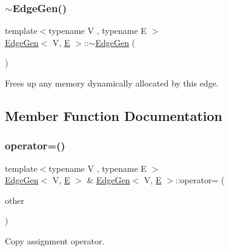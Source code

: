 \subsubsection{\texorpdfstring{$\sim$\+Edge\+Gen()}{~EdgeGen()}}
{\footnotesize\ttfamily template$<$typename V , typename E $>$ \\
\mbox{\hyperlink{classEdgeGen}{Edge\+Gen}}$<$ V, \mbox{\hyperlink{gmath_8h_ab587ba72a9c23f238cb4fd70e2fdb545}{E}} $>$\+::$\sim$\mbox{\hyperlink{classEdgeGen}{Edge\+Gen}} (\begin{DoxyParamCaption}{ }\end{DoxyParamCaption})}



Frees up any memory dynamically allocated by this edge. 



\subsection{Member Function Documentation}
\mbox{\label{classEdgeGen_adfd141be3aba2f0fec6a502db1476607}} 
\subsubsection{\texorpdfstring{operator=()}{operator=()}\hspace{0.1cm}{\footnotesize\ttfamily [1/2]}}
{\footnotesize\ttfamily template$<$typename V , typename E $>$ \\
\mbox{\hyperlink{classEdgeGen}{Edge\+Gen}}$<$ V, \mbox{\hyperlink{gmath_8h_ab587ba72a9c23f238cb4fd70e2fdb545}{E}} $>$ \& \mbox{\hyperlink{classEdgeGen}{Edge\+Gen}}$<$ V, \mbox{\hyperlink{gmath_8h_ab587ba72a9c23f238cb4fd70e2fdb545}{E}} $>$\+::operator= (\begin{DoxyParamCaption}\item[{const \mbox{\hyperlink{classEdgeGen}{Edge\+Gen}}$<$ V, \mbox{\hyperlink{gmath_8h_ab587ba72a9c23f238cb4fd70e2fdb545}{E}} $>$ \&}]{other }\end{DoxyParamCaption})}



Copy assignment operator. 

\mbox{\label{classEdgeGen_af076bdaa4ab4dea27638b940a0ff52af}} 
